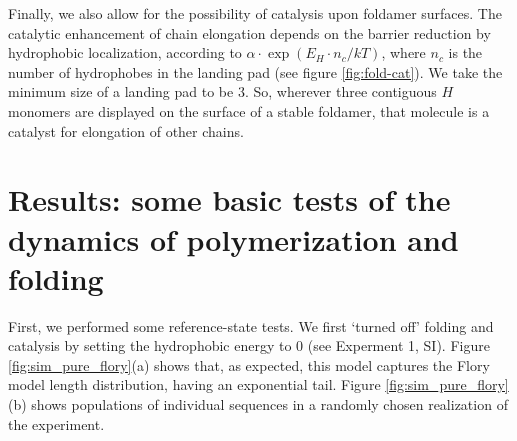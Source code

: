\documentclass[journal=jacsat,manuscript=article,layout=twocolumn]{achemso}
\newcommand*{\ga}{\alpha}
\begin{document}
 Finally, we also allow for the possibility of catalysis upon foldamer surfaces.  The catalytic 
enhancement of chain elongation depends on the barrier reduction by hydrophobic localization, 
according to $\ga\cdot\exp(E_{H}\cdot n_{c}/kT)$, where $n_c$ is the number of hydrophobes in the 
landing pad (see figure \ref{fig:fold-cat}).  We take the minimum size of a landing pad to be 3.  
So, wherever three contiguous $H$ monomers are displayed on the surface of a stable foldamer, that 
molecule is a catalyst for elongation of other chains.
 
\section{Results: some basic tests of the dynamics of polymerization and folding}

 First, we performed some reference-state tests.  We first `turned off' folding and catalysis by 
setting the hydrophobic energy to $0$ (see Experment 1, SI).  Figure \ref{fig:sim_pure_flory}(a) 
shows that, as expected, this model captures the Flory model length distribution, having an 
exponential tail.  Figure \ref{fig:sim_pure_flory}(b) shows populations of individual sequences in a 
randomly chosen realization of the experiment.
\end{document}
